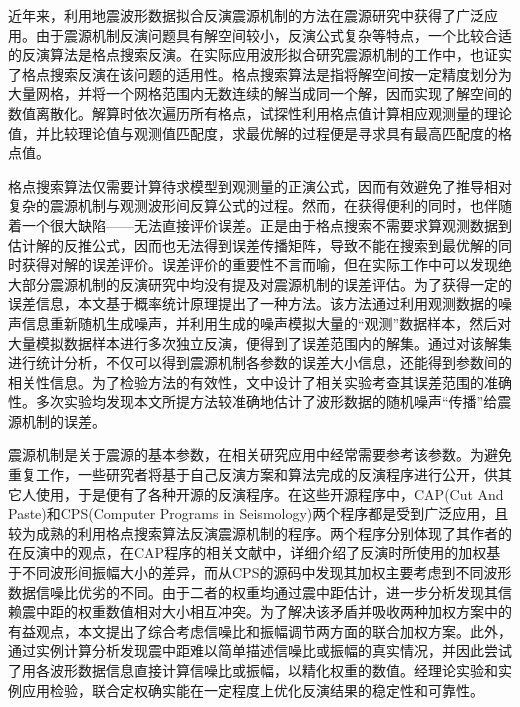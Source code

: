 

\begin{cnabstract}
近年来，利用地震波形数据拟合反演震源机制的方法在震源研究中获得了广泛应用。由于震源机制反演问题具有解空间较小，反演公式复杂等特点，一个比较合适的反演算法是格点搜索反演。在实际应用波形拟合研究震源机制的工作中，也证实了格点搜索反演在该问题的适用性。格点搜索算法是指将解空间按一定精度划分为大量网格，并将一个网格范围内无数连续的解当成同一个解，因而实现了解空间的数值离散化。解算时依次遍历所有格点，试探性利用格点值计算相应观测量的理论值，并比较理论值与观测值匹配度，求最优解的过程便是寻求具有最高匹配度的格点值。

格点搜索算法仅需要计算待求模型到观测量的正演公式，因而有效避免了推导相对复杂的震源机制与观测波形间反算公式的过程。然而，在获得便利的同时，也伴随着一个很大缺陷——无法直接评价误差。正是由于格点搜索不需要求算观测数据到估计解的反推公式，因而也无法得到误差传播矩阵，导致不能在搜索到最优解的同时获得对解的误差评价。误差评价的重要性不言而喻，但在实际工作中可以发现绝大部分震源机制的反演研究中均没有提及对震源机制的误差评估。为了获得一定的误差信息，本文基于概率统计原理提出了一种方法。该方法通过利用观测数据的噪声信息重新随机生成噪声，并利用生成的噪声模拟大量的“观测”数据样本，然后对大量模拟数据样本进行多次独立反演，便得到了误差范围内的解集。通过对该解集进行统计分析，不仅可以得到震源机制各参数的误差大小信息，还能得到参数间的相关性信息。为了检验方法的有效性，文中设计了相关实验考查其误差范围的准确性。多次实验均发现本文所提方法较准确地估计了波形数据的随机噪声“传播”给震源机制的误差。

震源机制是关于震源的基本参数，在相关研究应用中经常需要参考该参数。为避免重复工作，一些研究者将基于自己反演方案和算法完成的反演程序进行公开，供其它人使用，于是便有了各种开源的反演程序。在这些开源程序中，CAP(Cut And Paste)和CPS(Computer Programs in Seismology)两个程序都是受到广泛应用，且较为成熟的利用格点搜索算法反演震源机制的程序。两个程序分别体现了其作者的在反演中的观点，在CAP程序的相关文献中，详细介绍了反演时所使用的加权基于不同波形间振幅大小的差异，而从CPS的源码中发现其加权主要考虑到不同波形数据信噪比优劣的不同。由于二者的权重均通过震中距估计，进一步分析发现其信赖震中距的权重数值相对大小相互冲突。为了解决该矛盾并吸收两种加权方案中的有益观点，本文提出了综合考虑信噪比和振幅调节两方面的联合加权方案。此外，通过实例计算分析发现震中距难以简单描述信噪比或振幅的真实情况，并因此尝试了用各波形数据信息直接计算信噪比或振幅，以精化权重的数值。经理论实验和实例应用检验，联合定权确实能在一定程度上优化反演结果的稳定性和可靠性。


\end{cnabstract}
